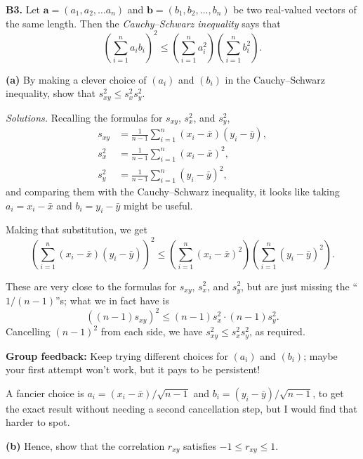 \documentclass[
  a4paper,
]{book}
\theoremstyle{definition}
\theoremstyle{definition}
\theoremstyle{definition}
\theoremstyle{definition}
\theoremstyle{remark}
\begin{document}
\textbf{B3.} Let \(\mathbf a = (a_1, a_2, \dots a_n)\) and \(\mathbf b = (b_1, b_2, \dots, b_n)\) be two real-valued vectors of the same length. Then the \emph{Cauchy--Schwarz inequality} says that
\[ \left( \sum_{i=1}^n a_i b_i \right)^2 \leq \left( \sum_{i=1}^n a_i^2 \right) \left(\sum_{i=1}^n b_i^2 \right) . \]

\textbf{(a)} By making a clever choice of \((a_i)\) and \((b_i)\) in the Cauchy--Schwarz inequality, show that \(s_{xy}^2 \leq s_x^2 s_y^2\).

\begin{myanswers}
\emph{Solutions.}
Recalling the formulas for \(s_{xy}\), \(s_x^2\), and \(s_y^2\),
\begin{align*}
s_{xy} &= \frac{1}{n-1} \sum_{i=1}^n (x_i - \bar x)(y_i - \bar y) ,\\
s_{x}^2 &= \frac{1}{n-1} \sum_{i=1}^n (x_i - \bar x)^2 ,\\
s_{y}^2 &= \frac{1}{n-1} \sum_{i=1}^n (y_i - \bar y)^2 ,
\end{align*}
and comparing them with the Cauchy--Schwarz inequality, it looks like taking \(a_i = x_i - \bar x\) and \(b_i = y_i - \bar y\) might be useful.

Making that substitution, we get
\[ \left( \sum_{i=1}^n (x_i - \bar x)(y_i - \bar y) \right)^2 \leq \left( \sum_{i=1}^n (x_i - \bar x)^2 \right) \left(\sum_{i=1}^n (y_i - \bar y)^2 \right) . \]

These are very close to the formulas for \(s_{xy}\), \(s_x^2\), and \(s_y^2\), but are just missing the ``\(1/(n-1)\)''s; what we in fact have is
\[ \left( (n-1) s_{xy} \right)^2 \leq (n-1)s_x^2 \cdot (n-1) s_y^2 .\]
Cancelling \((n-1)^2\) from each side, we have \(s_{xy}^2 \leq s_x^2 s_y^2\), as required.

\textbf{Group feedback:} Keep trying different choices for \((a_i)\) and \((b_i)\); maybe your first attempt won't work, but it pays to be persistent!

A fancier choice is \(a_i = (x_i - \bar x)/\sqrt{n-1}\) and \(b_i = (y_i - \bar y)/\sqrt{n-1}\), to get the exact result without needing a second cancellation step, but I would find that harder to spot.

\end{myanswers}

\textbf{(b)}
Hence, show that the correlation \(r_{xy}\) satisfies \(-1 \leq r_{xy} \leq 1\).
\end{document}
